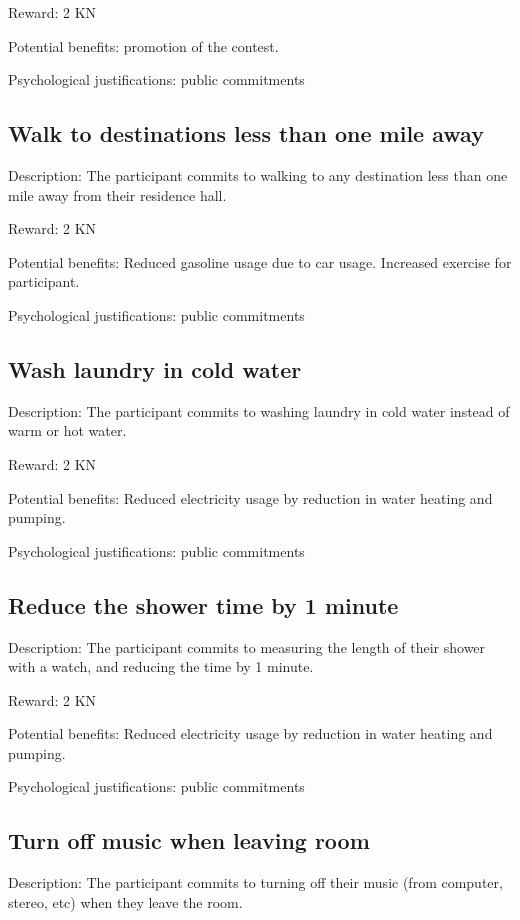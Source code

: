 Reward: 2 KN

Potential benefits: promotion of the contest.

Psychological justifications: public commitments

\subsection{Walk to destinations less than one mile away}

Description: The participant commits to walking to any destination less than one mile away from their residence hall.

Reward: 2 KN

Potential benefits: Reduced gasoline usage due to car usage. Increased exercise for participant.

Psychological justifications: public commitments

\subsection{Wash laundry in cold water}

Description: The participant commits to washing laundry in cold water instead of warm or hot water.

Reward: 2 KN

Potential benefits: Reduced electricity usage by reduction in water heating and pumping.

Psychological justifications: public commitments

\subsection{Reduce the shower time by 1 minute}

Description: The participant commits to measuring the length of their shower with a watch, and reducing the time by 1 minute.

Reward: 2 KN

Potential benefits: Reduced electricity usage by reduction in water heating and pumping.

Psychological justifications: public commitments

\subsection{Turn off music when leaving room}

Description: The participant commits to turning off their music (from computer, stereo, etc) when they leave the room.

